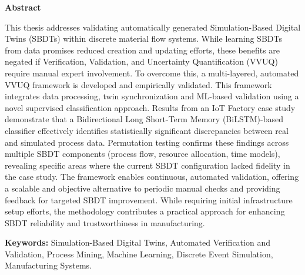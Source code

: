 \thispagestyle{plain} %

\vspace*{1.5in} %

\begin{center}
  {\Large \textbf{Abstract}}
\end{center}

This thesis addresses validating automatically generated Simulation-Based Digital Twins (SBDTs) within discrete material flow systems. While learning SBDTs from data promises reduced creation and updating efforts, these benefits are negated if Verification, Validation, and Uncertainty Quantification (VVUQ) require manual expert involvement. To overcome this, a multi-layered, automated VVUQ framework is developed and empirically validated. This framework integrates data processing, twin synchronization and ML-based validation using a novel supervised classification approach. Results from an IoT Factory case study demonstrate that a Bidirectional Long Short-Term Memory (BiLSTM)-based classifier effectively identifies statistically significant discrepancies between real and simulated process data. Permutation testing confirms these findings across multiple SBDT components (process flow, resource allocation, time models), revealing specific areas where the current SBDT configuration lacked fidelity in the case study. The framework enables continuous, automated validation, offering a scalable and objective alternative to periodic manual checks and providing feedback for targeted SBDT improvement. While requiring initial infrastructure setup efforts, the methodology contributes a practical approach for enhancing SBDT reliability and trustworthiness in manufacturing.
\medskip

\textbf{Keywords:} Simulation-Based Digital Twins, Automated Verification and Validation, Process Mining, Machine Learning, Discrete Event Simulation, Manufacturing Systems.

\clearpage